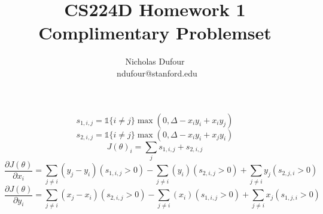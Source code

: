\documentclass{article}[12pt]
\title{CS224D Homework 1 \\ Complimentary Problemset}
\author{Nicholas Dufour \\\ ndufour@stanford.edu}
\begin{document}
$$s_{1,i,j} = \mathds{1}\{i\not=j\}\max(0, \Delta - x_i y_i + x_i y_j)$$
$$s_{2,i,j} = \mathds{1}\{i\not=j\}\max(0, \Delta - x_i y_i + x_j y_i)$$
$$J(\theta)_i = \sum_{j} s_{1,i,j} + s_{2,i,j}$$
$$\frac{\partial J(\theta)}{\partial x_i} = \sum_{j \not=i} (y_j-y_i) (s_{1,i,j} > 0) - \sum_{j \not= i} (y_i) (s_{2,i,j} > 0) + \sum_{j\not= i} y_j (s_{2,j,i}>0)$$
$$\frac{\partial J(\theta)}{\partial y_i} = \sum_{j \not= i} (x_j-x_i) (s_{2,i,j} > 0)  - \sum_{j \not=i} (x_i) (s_{1,i,j} > 0) + \sum_{j\not= i} x_j (s_{1,j,i}>0)$$
\end{document}
